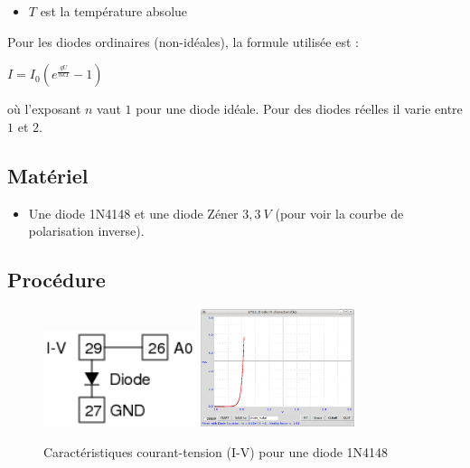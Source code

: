 \documentclass{book}
\begin{document}
\begin{itemize}
  \item $T$ est la température absolue
\end{itemize}



Pour les diodes ordinaires (non-idéales), la formule utilisée est :



$I=I_{0}\left(e^{\frac{qU}{nkT} }-1\right)$



où l'exposant $n$ vaut $1$  pour une diode idéale. Pour des diodes réelles il varie entre $1$ et $2$.

\subsection{Matériel}


\begin{itemize}
  \item Une diode 1N4148 et une diode Zéner $3,3\ V$ (pour voir la courbe de polarisation inverse).
\end{itemize}

\subsection{Procédure}


\begin{figure}[h!]
\begin{center}
\caption{\label{fig:Diode-IV-characteristic}Caractéristiques courant-tension (I-V) pour une diode 1N4148 }\vspace{0.5em}
\includegraphics[width=0.4\textwidth, height=0.3\textwidth, keepaspectratio]{Schematic-diode-iv.png}
\includegraphics[width=0.4\textwidth, height=0.3\textwidth, keepaspectratio]{Pic-diode-4148.png}
\end{center}
\end{figure}
\end{document}
